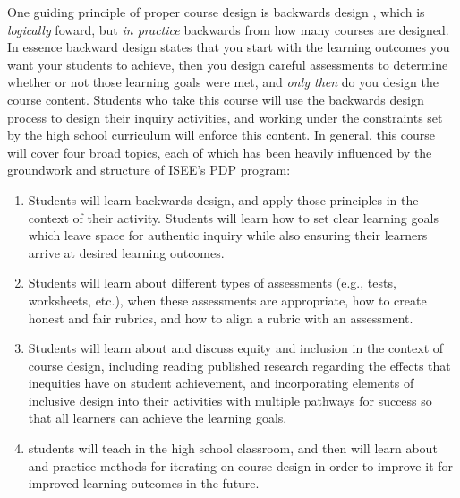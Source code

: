 \documentclass[aasms,11pt]{article}
\begin{document}
One guiding principle of proper course design is backwards design \citep{wiggins&mctighe1998}, which is \emph{logically} foward, but \emph{in practice} backwards from how many courses are designed.
In essence backward design states that you start with the learning outcomes you want your students to achieve, then you design careful assessments to determine whether or not those learning goals were met, and \emph{only then} do you design the course content.
Students who take this course will use the backwards design process to design their inquiry activities, and working under the constraints set by the high school curriculum will enforce this content.
In general, this course will cover four broad topics, each of which has been heavily influenced by the groundwork and structure of ISEE's PDP program:
\begin{enumerate}
\vspace{-9pt}
\item Students will learn backwards design, and apply those principles in the context of their activity.
Students will learn how to set clear learning goals which leave space for authentic inquiry while also ensuring their learners arrive at desired learning outcomes.
\vspace{-9pt}
\item Students will learn about different types of assessments (e.g., tests, worksheets, etc.), when these assessments are appropriate, how to create honest and fair rubrics, and how to align a rubric with an assessment.
\vspace{-9pt}
\item Students will learn about and discuss equity and inclusion in the context of course design, including reading published research regarding the effects that inequities have on student achievement, and incorporating elements of inclusive design into their activities with multiple pathways for success so that all learners can achieve the learning goals.
\vspace{-9pt}
\item students will teach in the high school classroom, and then will learn about and practice methods for iterating on course design in order to improve it for improved learning outcomes in the future.
\vspace{-9pt}
\end{enumerate}
\end{document}
